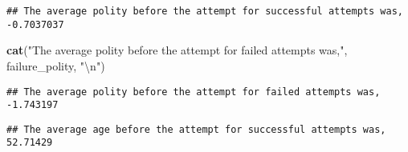 \documentclass[
]{article}
\newenvironment{Shaded}{\begin{snugshade}}{\end{snugshade}}
\newcommand{\CharTok}[1]{\textcolor[rgb]{0.31,0.60,0.02}{#1}}
\newcommand{\KeywordTok}[1]{\textcolor[rgb]{0.13,0.29,0.53}{\textbf{#1}}}
\newcommand{\NormalTok}[1]{#1}
\newcommand{\OperatorTok}[1]{\textcolor[rgb]{0.81,0.36,0.00}{\textbf{#1}}}
\newcommand{\StringTok}[1]{\textcolor[rgb]{0.31,0.60,0.02}{#1}}
\begin{document}
\begin{Shaded}
\end{Shaded}

\begin{verbatim}
## The average polity before the attempt for successful attempts was, -0.7037037
\end{verbatim}

\begin{Shaded}
\begin{Highlighting}[]
\KeywordTok{cat}\NormalTok{(}\StringTok{"The average polity before the attempt for failed attempts was,"}\NormalTok{, failure_polity, }\StringTok{"}\CharTok{\textbackslash{}n}\StringTok{"}\NormalTok{)}
\end{Highlighting}
\end{Shaded}

\begin{verbatim}
## The average polity before the attempt for failed attempts was, -1.743197
\end{verbatim}

\begin{Shaded}
\end{Shaded}

\begin{verbatim}
## The average age before the attempt for successful attempts was, 52.71429
\end{verbatim}
\end{document}
